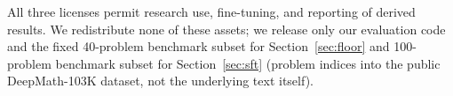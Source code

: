 \documentclass{article}
\begin{document}
All three licenses permit research use, fine-tuning, and reporting of derived results. We redistribute none of these assets; we release only our evaluation code and the fixed 40-problem benchmark subset for Section~\ref{sec:floor} and 100-problem benchmark subset for Section~\ref{sec:sft} (problem indices into the public DeepMath-103K dataset, not the underlying text itself).


\end{document}
